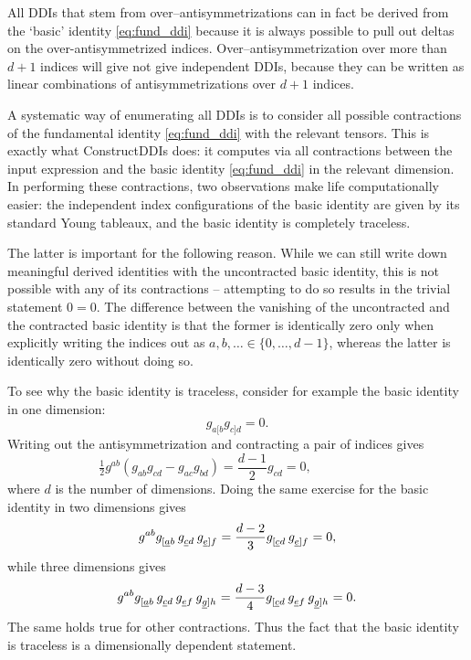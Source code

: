 \documentclass[a4paper,11pt,english]{article}
\newcommand{\func}[1]{{\ttfamily #1}}
\newcommand{\funcref}[1]{\hyperref[#1]{{\ttfamily\nameref*{#1}}}}
\begin{document}
All DDIs that stem from over--antisymmetrizations
can in fact be derived from the `basic' identity \eqref{eq:fund_ddi} 
because it is always possible to pull out deltas on the over-antisymmetrized indices.  
Over--antisymmetrization over more than $d+1$ indices will give not give independent DDIs, because 
they can be written as linear combinations of antisymmetrizations over $d+1$ indices.

A systematic way of enumerating all DDIs is to consider all possible contractions of the fundamental
identity \eqref{eq:fund_ddi} with the relevant tensors. This is exactly what \func{ConstructDDIs}
does: it computes via \funcref{AllContractions} all contractions between the input expression and the basic identity 
\eqref{eq:fund_ddi} in the relevant dimension. 
In performing these contractions, two observations make life computationally easier: the 
independent index configurations of the basic identity are given by its standard Young tableaux,
and the basic identity is completely traceless.

The latter is important for the following reason.  While we can still write down
meaningful derived identities with the uncontracted basic identity, this is not possible with
any of its contractions -- attempting to do so results in the  trivial statement $0=0$. The
difference between the vanishing of the uncontracted and the contracted basic identity is
that the former is identically zero only when explicitly writing the indices out as 
$a,b,\ldots \in \{0,\ldots,d-1\}$,
whereas the latter is identically zero without doing so.

To see why the basic identity is traceless, consider for example the basic identity in one 
dimension:
\begin{equation}
	g_{a[b} g_{c]d} = 0.
\end{equation}
Writing out the antisymmetrization and contracting a pair of indices gives
\begin{equation}
	\tfrac{1}{2} g^{ab} \left( g_{ab} g_{cd} - g_{ac} g_{bd} \right)  
	= \frac{d-1}{2} g_{cd} = 0 , \phantom{\qquad\qquad\quad}
\end{equation}
where $d$ is the number of dimensions.
Doing the same exercise for the basic identity in two dimensions gives
\begin{equation}
	g^{ab} 
	g\indices{_{[\underline{a}b}} \, g\indices{_{\underline{c}d}} \, g\indices{_{\underline{e}]f}}
	=
	\frac{d-2}{3} g\indices{_{[\underline{c}d}} \, g\indices{_{\underline{e}]f}} 
	= 0 ,
\end{equation}
while three dimensions gives
\begin{equation}
	g^{ab} 
	g\indices{_{[\underline{a}b}} \, g\indices{_{\underline{c}d}} \, 
	g\indices{_{\underline{e}f}} \, g\indices{_{\underline{g}]h}}
	=
	\frac{d-3}{4}
	g\indices{_{[\underline{c}d}} \, g\indices{_{\underline{e}f}} \, g\indices{_{\underline{g}]h}} 
	= 0.
\end{equation}
The same holds true for other contractions. Thus the fact that the basic identity is traceless
is a dimensionally dependent statement.
\end{document}
